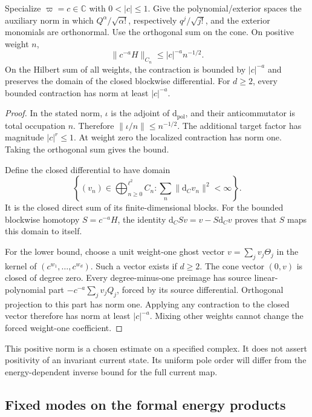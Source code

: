 \begin{proposition}
\label{rc:prop:cone-norm}
Specialize \(\varpi=c\in\mathbb C\) with \(0<|c|\leq1\).
Give the polynomial/exterior spaces the auxiliary norm in which
\(Q^\alpha/\sqrt{\alpha!}\), respectively
\(q^j/\sqrt{j!}\), and the exterior monomials are orthonormal.
Use the orthogonal sum on the cone.  On positive weight \(n\),
\[
 \|c^{-a}H\|_{C_n}\leq |c|^{-a}n^{-1/2}.
\]
On the Hilbert sum of all weights, the contraction is bounded
by \(|c|^{-a}\) and preserves the domain of the closed
blockwise differential.  For \(d\geq2\), every bounded
contraction has norm at least \(|c|^{-a}\).
\end{proposition}
\begin{proof}
In the stated norm, \(\iota\) is the adjoint of
\(\mathrm d_{\mathrm{pol}}\), and their anticommutator is total
occupation \(n\).  Therefore
\(\|\iota/n\|\leq n^{-1/2}\).
The additional target factor has magnitude \(|c|^r\leq1\).
At weight zero the localized contraction has norm one.
Taking the orthogonal sum gives the bound.

Define the closed differential to have domain
\[
 \left\{(v_n)\in\bigoplus_{n\geq0}^{\ell^2}C_n:
                  \sum_n\|\mathrm d_Cv_n\|^2<\infty\right\}.
\]
It is the closed direct sum of its finite-dimensional blocks.
For the bounded blockwise homotopy \(S=c^{-a}H\),
the identity \(\mathrm d_CS v=v-S\mathrm d_Cv\) proves that
\(S\) maps this domain to itself.

For the lower bound, choose a unit weight-one ghost vector
\(v=\sum_jv_j\Theta_j\) in the kernel of
\((c^{w_1},\ldots,c^{w_d})\).  Such a vector exists if \(d\geq2\).
The cone vector \((0,v)\) is closed of degree zero.
Every degree-minus-one preimage has source linear-polynomial
part \(-c^{-a}\sum_jv_jQ_j\), forced by its source differential.
Orthogonal projection to this part has norm one.  Applying
any contraction to the closed vector therefore has norm at
least \(|c|^{-a}\).  Mixing other weights cannot change the
forced weight-one coefficient.
\end{proof}

This positive norm is a chosen estimate on a specified complex.
It does not assert positivity of an invariant current state.
Its uniform pole order will differ from the energy-dependent
inverse bound for the full current map.

\subsection{Fixed modes on the formal energy products}

